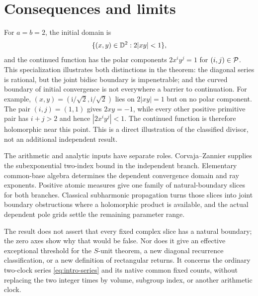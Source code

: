 \section{Consequences and limits}

For \(a=b=2\), the initial domain is
\[
\{(x,y)\in\mathbb D^2:2|xy|<1\},
\]
and the continued function has the polar components
\(2x^iy^j=1\) for \((i,j)\in\mathcal P\).
This specialization illustrates both distinctions in the theorem:
the diagonal series is rational, but the joint bidisc boundary is
impenetrable; and the curved boundary of initial convergence is
not everywhere a barrier to continuation.
For example, \((x,y)=(\mathrm i/\sqrt2,\mathrm i/\sqrt2)\) lies on
\(2|xy|=1\) but on no polar component. The pair \((i,j)=(1,1)\)
gives \(2xy=-1\), while every other positive primitive pair has
\(i+j>2\) and hence \(|2x^iy^j|<1\).
The continued function is therefore holomorphic near this point.
This is a direct illustration of the classified divisor, not an
additional independent result.

The arithmetic and analytic inputs have separate roles.
Corvaja--Zannier supplies the subexponential two-index bound in the
independent branch. Elementary common-base algebra determines the
dependent convergence domain and ray exponents. Positive atomic
measures give one family of natural-boundary slices for both
branches. Classical subharmonic propagation turns those slices into
joint boundary obstructions where a holomorphic product is
available, and the actual dependent pole grids settle the remaining
parameter range.

The result does not assert that every fixed complex slice has a
natural boundary; the zero axes show why that would be false.
Nor does it give an effective exceptional threshold for the
\(S\)-unit theorem, a new diagonal recurrence classification, or a
new definition of rectangular returns.
It concerns the ordinary two-clock series \eqref{eq:intro-series}
and its native common fixed counts, without replacing the two
integer times by volume, subgroup index, or another arithmetic clock.
